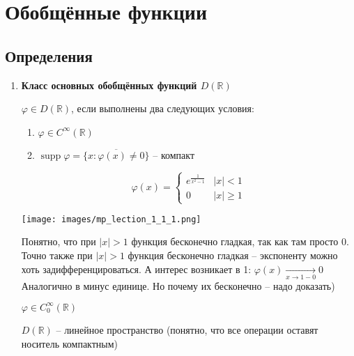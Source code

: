\chapter{Обобщённые функции}
\section{Определения}
\begin{enumerate}
    \item \textbf{Класс основных обобщённых функций $D(\mathbb{R})$}
    \begin{definition}
        $\varphi \in D(\mathbb{R})$, если выполнены два следующих условия: \begin{enumerate}
            \item $\varphi \in C^{\infty} (\mathbb{R})$
            \item $\operatorname{supp} \varphi = \overline{\{ x: \varphi(x) \neq 0\}}$ -- компакт\\
        \end{enumerate}
    \end{definition}
    \begin{example}
        \begin{equation*} \varphi (x) =
            \begin{cases}
            e^{\frac{1}{x^2 -1}} & |x| < 1 \\
            0 & |x| \geq 1
            \end{cases}
        \end{equation*}
        \begin{minipage}{8 cm}
        \texttt{[image: images/mp\_lection\_1\_1\_1.png]}
        \end{minipage}
        \begin{minipage}{10 cm}
            Понятно, что при $|x| > 1$ функция бесконечно гладкая, так как там просто 0. Точно также при $|x| > 1$ функция бесконечно гладкая -- экспоненту можно хоть задифференцироваться. А интерес возникает в 1: $\varphi (x) \underset{x \to 1 - 0}{\longrightarrow} 0 $ Аналогично в минус единице. Но почему их бесконечно -- надо доказать)
        \end{minipage}
        \begin{exercise}
        $\varphi \in C_0^{\infty} (\mathbb{R})$
        \end{exercise}
    \end{example}

    $D(\mathbb{R})$ -- линейное пространство (понятно, что все операции оставят носитель компактным)
    

\end{enumerate}
